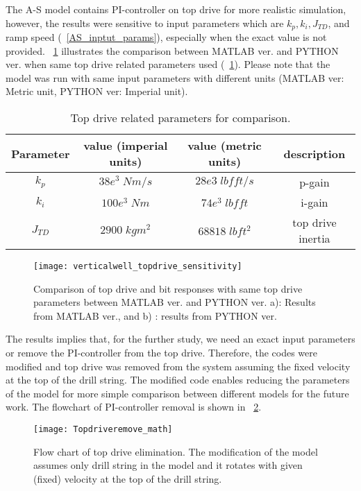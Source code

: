 The A-S model contains PI-controller on top drive for more realistic simulation, however, the results were sensitive to input parameters which are $k_p, k_i, J_{TD}$, and ramp speed (\tablename~\ref{AS_inptut_params}), especially when the exact value is not provided. \figurename~\ref{figure_topdrive_sensitivity} illustrates the comparison between MATLAB ver. and PYTHON ver. when same top drive related parameters used 
(\tablename~\ref{table_topdrivesensitivity_input}). Please note that the model was run with same input parameters with different units (MATLAB ver: Metric unit, PYTHON ver: Imperial unit). 

\begin{table}[!hbt]
\centering
\begin{tabular}{|c|c|c|c|}
\hline
Parameter & value (imperial units) & value (metric units) & description\\                                                              
\hline
$k_p$ & $38e^3 \; Nm/s $ & $28e3\; lbfft/s$ & p-gain \\                                                  
\hline
$k_i$ & $100e^3 \; Nm$ & $74e^3\; lbfft$  & i-gain \\                                                  
\hline
$J_{TD}$ & $2900 \; kgm^2 $ & $ 68818 \; lbft^2$ & top drive inertia\\                                                       
\hline
\end{tabular}
\caption[Top drive related parameters for comparison.]{Top drive related parameters for comparison.}\label{table_topdrivesensitivity_input}
\end{table}

\begin{figure}[!hbt]
  \centering
  \texttt{[image: verticalwell\_topdrive\_sensitivity]}
  \caption[Comparison of drillstring response to same top drive parameters]{Comparison of top drive and bit responses with same top drive parameters between MATLAB ver. and PYTHON ver. a): Results from MATLAB ver., and b) : results from PYTHON ver.}\label{figure_topdrive_sensitivity}
\end{figure}

The results implies that, for the further study, we need an exact input parameters or remove the PI-controller from the top drive. Therefore, the codes were modified and top drive was removed from the system assuming the fixed velocity at the top of the drill string. The modified code enables reducing the parameters of the model for more simple comparison between different models for the future work. The flowchart of PI-controller removal is shown in \figurename~\ref{figure_Topdriveremove_math}.
\begin{figure}[!hbt]
  \centering
  \texttt{[image: Topdriveremove\_math]}
  \caption[flow chart of top drive elimination]{Flow chart of top drive elimination. The modification of the model assumes only drill string in the model and it rotates with given (fixed) velocity at the top of the drill string.}\label{figure_Topdriveremove_math}
\end{figure}


